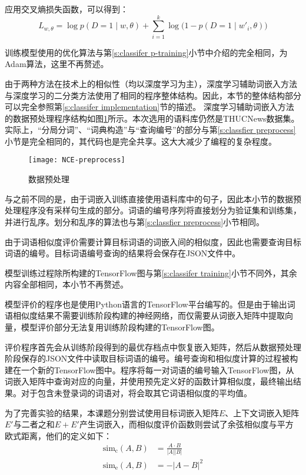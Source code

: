 应用交叉熵损失函数，可以得到：
\begin{equation}
L_{w, \theta} = \log p(D = 1 \mid w, \theta) + \sum_{i = 1}^{k} \log\bigl(1 - p(D = 1 \mid w'_i, \theta)\bigr)
\end{equation}

训练模型使用的优化算法与第\ref{s:classifer p-training}小节中介绍的完全相同，为Adam算法，这里不再赘述。

由于两种方法在技术上的相似性（均以深度学习为主），深度学习辅助词嵌入方法与深度学习的二分类方法使用了相同的程序整体结构。因此，本节的整体结构部分可以完全参照第\ref{s:classifer implementation}节的描述。
深度学习辅助词嵌入方法的数据预处理程序结构如图\ref{f:nce preprocess}所示。本次选用的语料库仍然是THUCNews数据集。实际上，“分局分词”、“词典构造”与“查询编号”的部分与第\ref{s:classfier preprocess}小节是完全相同的，其代码也是完全共享。这大大减少了编程的复杂程度。

\begin{figure}[h]
	\centering
	\texttt{[image: NCE-preprocess]}
	\caption{数据预处理}
	\label{f:nce preprocess}
	\vspace{-1em}
\end{figure}

与之前不同的是，由于词嵌入训练直接使用语料库中的句子，因此本小节的数据预处理程序没有采样句生成的部分。词语的编号序列将直接划分为验证集和训练集，并进行乱序。划分和乱序的算法也与第\ref{s:classfier preprocess}小节相同。

由于词语相似度评价需要计算目标词语的词嵌入间的相似度，因此也需要查询目标词语的编号。目标词语编号查询的结果将会保存在JSON文件中。

模型训练过程除所构建的TensorFlow图与第\ref{s:classifer training}小节不同外，其余内容全部相同，本小节不再赘述。

模型评价的程序也是使用Python语言的TensorFlow平台编写的。但是由于输出词语相似度结果不需要训练阶段构建的神经网络，而仅需要从词嵌入矩阵中提取向量，模型评价部分无法复用训练阶段构建的TensorFlow图。

评价程序首先会从训练阶段得到的最优存档点中恢复嵌入矩阵，然后从数据预处理阶段保存的JSON文件中读取目标词语的编号。编号查询和相似度计算的过程被构建在一个新的TensorFlow图中。程序将每一对词语的编号输入TensorFlow图，从词嵌入矩阵中查询对应的向量，并使用预先定义好的函数计算相似度，最终输出结果。对于包含未登录词的词语对，将会取其它词语相似度的平均值。

为了完善实验的结果，本课题分别尝试使用目标词嵌入矩阵$E$、上下文词嵌入矩阵$E'$与二者之和$E + E'$产生词嵌入，而相似度评价函数则尝试了余弦相似度与平方欧式距离，他们的定义如下：
\begin{align}
\text{sim}_\text{c}(A, B) & = \frac{A \cdot B}{|A| |B|} \\
\text{sim}_\text{e}(A, B) & = -|A - B|^2
\end{align}

